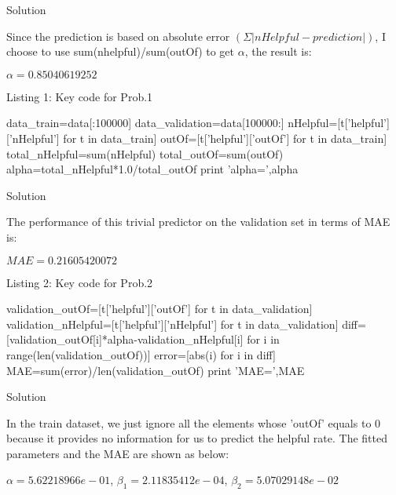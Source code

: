 \documentclass{assignment}
\date{February 20, 2017}
\begin{document}
\begin{problemlist}




\pbitem Solution

Since the prediction is based on absolute error $(\Sigma|nHelpful-prediction|)$, I choose to use sum(nhelpful)/sum(outOf) to get $\alpha$, the result is:

\begin{center}
$\alpha=0.85040619252$
\end{center}


\vspace{2ex}
\begin{center} 
Listing 1: Key code for Prob.1
\end{center}
\begin{python}
data_train=data[:100000]
data_validation=data[100000:]
nHelpful=[t['helpful']['nHelpful'] for t in data_train]
outOf=[t['helpful']['outOf'] for t in data_train]
total_nHelpful=sum(nHelpful)
total_outOf=sum(outOf)
alpha=total_nHelpful*1.0/total_outOf
print 'alpha=',alpha
\end{python}

\vspace{3ex}

\pbitem Solution

The performance of this trivial predictor on the validation set in terms of MAE is:

\begin{center}
$MAE=0.21605420072$
\end{center}

\begin{center} 
Listing 2: Key code for Prob.2
\end{center}
\begin{python}
validation_outOf=[t['helpful']['outOf'] for t in data_validation]
validation_nHelpful=[t['helpful']['nHelpful'] for t in data_validation]
diff=[validation_outOf[i]*alpha-validation_nHelpful[i] for i in range(len(validation_outOf))]
error=[abs(i) for i in diff]
MAE=sum(error)/len(validation_outOf)
print 'MAE=',MAE
\end{python}

\pbitem Solution

In the train dataset, we just ignore all the elements whose 'outOf' equals to 0 because it provides no information for us to predict the helpful rate. The fitted parameters and the MAE are shown as below:

\begin{center} 
$\alpha=5.62218966e-01$, $\beta_1=2.11835412e-04$, $\beta_2=5.07029148e-02$


\end{center}
\end{problemlist}
\end{document}
